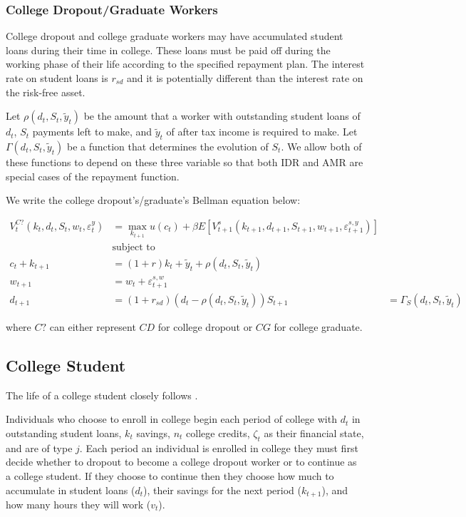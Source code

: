   \subsubsection{College Dropout/Graduate Workers}

    College dropout and college graduate workers may have accumulated student loans during their
    time in college. These loans must be paid off during the working phase of their life according
    to the specified repayment plan. The interest rate on student loans is $r_{sd}$ and it is
    potentially different than the interest rate on the risk-free asset.

    Let $\rho(d_t, S_t, \tilde{y}_t)$ be the amount that a worker with outstanding student loans
    of $d_t$, $S_t$ payments left to make, and $\tilde{y}_t$ of after tax income is required to
    make. Let $\Gamma(d_t, S_t, \tilde{y}_t)$ be a function that determines the evolution of $S_t$.
    We allow both of these functions to depend on these three variable so that both IDR and AMR are
    special cases of the repayment function.

    We write the college dropout's/graduate's Bellman equation below:

    \begin{align*}
      V^{C?}_t(k_t, d_t, S_t, w_t, \varepsilon^y_t) &= \max_{k_{t+1}} u(c_t) + \beta E \left[ V^{s}_{t+1}(k_{t+1}, d_{t+1}, S_{t+1}, w_{t+1}, \varepsilon^{s, y}_{t+1}) \right] \\
      &\text{subject to } \\
      c_t + k_{t+1} &= (1 + r) k_t + \tilde{y}_t + \rho(d_t, S_t, \tilde{y}_t) \\
      w_{t+1} &= w_t + \varepsilon^{s, w}_{t+1} \\
      d_{t+1} &= (1 + r_{sd}) (d_t - \rho(d_t, S_t, \tilde{y}_t))
      S_{t+1} &= \Gamma_S(d_t, S_t, \tilde{y}_t)
    \end{align*}

    where $C?$ can either represent $CD$ for college dropout or $CG$ for college graduate.


\subsection{College Student}

  The life of a college student closely follows \cite{HendricksLeukhina2017}.

  Individuals who choose to enroll in college begin each period of college with $d_t$ in outstanding
  student loans, $k_t$ savings, $n_t$ college credits, $\zeta_t$ as their financial state, and are
  of type $j$. Each period an individual is enrolled in college they must first decide whether to
  dropout to become a college dropout worker or to continue as a college student. If they choose to
  continue then they choose how much to accumulate in student loans ($d_t$), their savings for the
  next period ($k_{t+1}$), and how many hours they will work ($v_t$).

